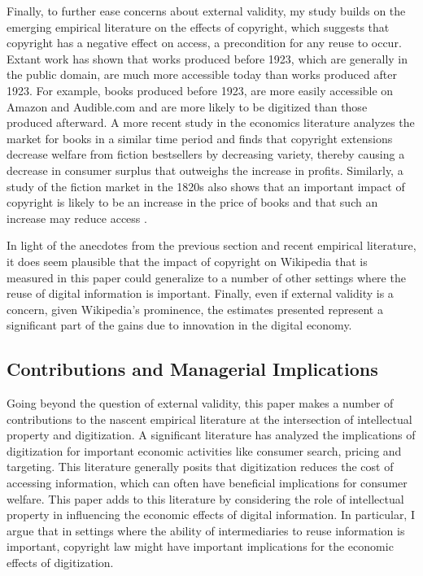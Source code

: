 \documentclass[11pt]{article}
\begin{document}
Finally, to further ease concerns about external validity, my study builds on the emerging empirical literature on the effects of copyright, which suggests that copyright has a negative effect on access, a precondition for any reuse to occur. Extant work \citep{heald_property_2007, heald_does_2009, buccafusco_bad_2012} has shown that works produced before 1923, which are generally in the public domain, are much more accessible today than works produced after 1923. For example, books produced before 1923, are more easily accessible on Amazon and Audible.com and are more likely to be digitized \citep{brooks_how_2005} than those produced afterward. A more recent study in the economics literature \citep{reimers_effects_2013} analyzes the market for books in a similar time period and finds that copyright extensions decrease welfare from fiction bestsellers by decreasing variety, thereby causing a decrease in consumer surplus that outweighs the increase in profits. Similarly, a study of the fiction market in the 1820s also shows that an important impact of copyright is likely to be an increase in the price of books and that such an increase may reduce access \citep{li_dead_2012}. 

In light of the anecdotes from the previous section and recent empirical literature, it does seem plausible that the impact of copyright on Wikipedia that is measured in this paper could generalize to a number of other settings where the reuse of digital information is important. Finally, even if external validity is a concern, given Wikipedia's prominence, the estimates presented represent a significant part of the gains due to innovation in the digital economy.

\subsection{Contributions and Managerial Implications}


Going beyond the question of external validity, this paper makes a number of contributions to the nascent empirical literature at the intersection of intellectual property and digitization. A significant literature has analyzed the implications of digitization for important economic activities like consumer search, pricing and targeting. This literature generally posits that digitization reduces the cost of accessing information, which can often have beneficial implications for consumer welfare. This paper adds to this literature by considering the role of intellectual property in influencing the economic effects of digital information. In particular, I argue that in settings where the ability of intermediaries to reuse information is important, copyright law might have important implications for the economic effects of digitization. 
\end{document}
